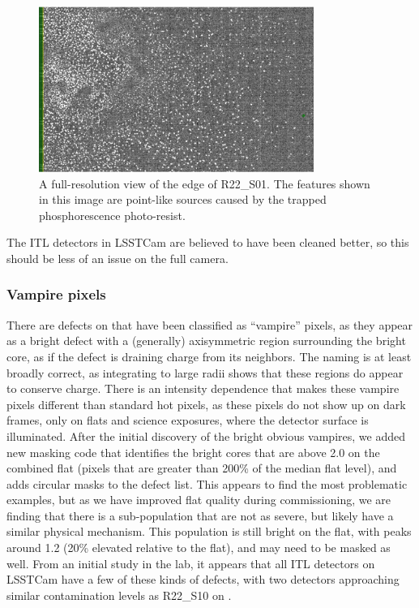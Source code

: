 \begin{figure}
  \begin{center}
  \includegraphics[width=0.8\textwidth]{figures/isr-f02-phosphorescence_point_like.pdf}
  \caption{A full-resolution view of the edge of R22\_S01.  The features shown in this image are point-like sources caused by the trapped phosphorescence photo-resist.}
  \end{center}
\end{figure}

The ITL detectors in LSSTCam are believed to have been cleaned better, so this should be less of an issue on the full camera.

\subsubsection{Vampire pixels}

There are defects on \ComCam that have been classified as ``vampire'' pixels, as they appear as a bright defect with a (generally) axisymmetric region surrounding the bright core, as if the defect is draining charge from its neighbors.
The naming is at least broadly correct, as integrating to large radii shows that these regions do appear to conserve charge.
There is an intensity dependence that makes these vampire pixels different than standard hot pixels, as these pixels do not show up on dark frames, only on flats and science exposures, where the detector surface is illuminated.
After the initial discovery of the bright obvious vampires, we added new masking code that identifies the bright cores that are above 2.0 on the combined flat (pixels that are greater than 200\% of the median flat level), and adds circular masks to the defect list.
This appears to find the most problematic examples, but as we have improved flat quality during commissioning, we are finding that there is a sub-population that are not as severe, but likely have a similar physical mechanism.
This population is still bright on the flat, with peaks around 1.2 (20\% elevated relative to the flat), and may need to be masked as well.
From an initial study in the lab, it appears that all ITL detectors on LSSTCam have a few of these kinds of defects, with two detectors approaching similar contamination levels as R22\_S10 on \ComCam.


